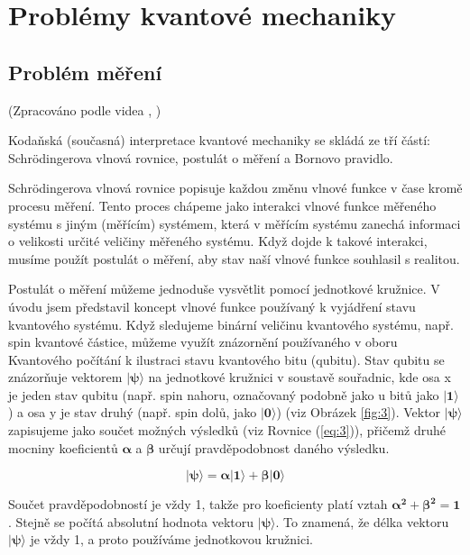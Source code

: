 \section{Problémy kvantové mechaniky}
    \subsection{Problém měření}
    (Zpracováno podle videa , \cite{measprob})

Kodaňská (současná) interpretace kvantové mechaniky se skládá ze tří částí: Schrödingerova vlnová rovnice, postulát o měření a Bornovo pravidlo.

Schrödingerova vlnová rovnice popisuje každou změnu vlnové funkce v čase kromě procesu měření. Tento proces chápeme jako interakci vlnové funkce měřeného systé\-mu s jiným (měřícím) systémem, která v měřícím systému zanechá informaci o velikosti určité veličiny měřeného systému. Když dojde k takové interakci, musíme použít postulát o měření, aby stav naší vlnové funkce souhlasil s realitou.

Postulát o měření můžeme jednoduše vysvětlit pomocí jednotkové kružnice. V úvodu jsem představil koncept vlnové funkce používaný k vyjádření stavu kvantového systému. Když sledujeme binární veličinu kvantového systému, např. spin kvantové částice, můžeme využít znázorně\-ní používaného v oboru Kvantového počítání k ilustraci stavu kvantového bitu (qubitu). Stav qubitu se znázorňuje vektorem $\bm{|\psi\rangle}$ na jednotkové kružnici v soustavě souřadnic, kde osa x je jeden stav qubitu (např. spin nahoru, označovaný podobně jako u bitů jako $\bm{|1\rangle}$) a osa y je stav druhý (např. spin dolů, jako $\bm{|0\rangle}$) (viz Obrázek \ref{fig:3}). Vektor $\bm{|\psi\rangle}$ zapisujeme jako součet možných výsledků (viz Rovnice (\ref{eq:3})), přičemž druhé mocniny koeficientů $\bm{\alpha}$ a $\bm{\beta}$ určují pravděpodobnost daného výsledku. 

\begin{equation}
    \bm{|\psi\rangle = \alpha|1\rangle + \beta|0\rangle}
    \label{eq:3}
\end{equation}

Součet pravděpodobností je vždy 1, takže pro koeficienty platí vztah $\bm{\alpha^2 + \beta^2 = 1}$. Stejně se počítá absolutní hodnota vektoru $\bm{|\psi\rangle}$. To znamená, že délka vektoru $\bm{|\psi\rangle}$ je vždy 1, a proto používáme jednotkovou kružnici. 

\clearpage

